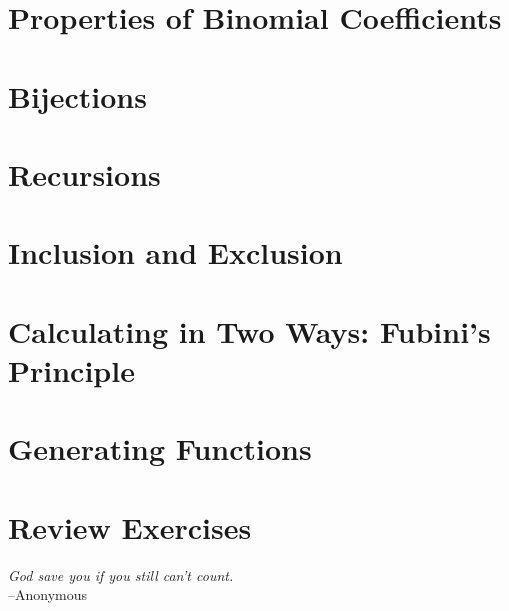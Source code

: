 \documentclass{book}
\begin{document}
\chapter{Properties of Binomial Coefficients}
\chapter{Bijections}
\chapter{Recursions}
\chapter{Inclusion and Exclusion}
\chapter{Calculating in Two Ways: Fubini's Principle}
\chapter{Generating Functions}
\chapter{Review Exercises}




\newpage
\begin{flushright}
\vspace*{\fill}
\emph{God save you if you still can't count.}\\
--Anonymous
\end{flushright}
\end{document}
